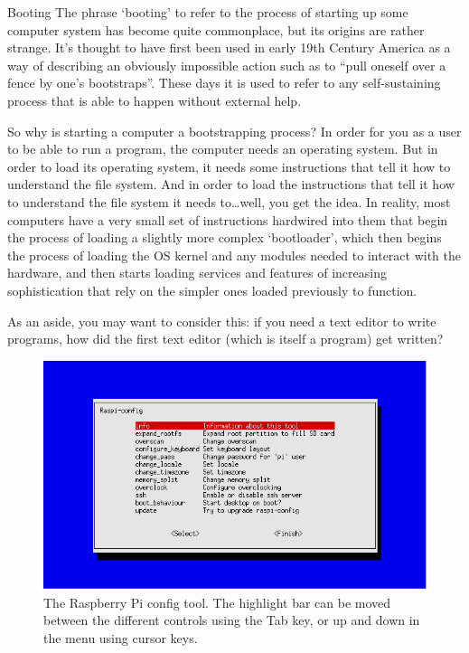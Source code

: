 \begin{diversion}{Booting}
\label{bootbox}
The phrase `booting' to refer to the process of starting up some computer system has become quite commonplace, but its origins are rather strange. It's thought to have first been used in early 19th Century America as a way of describing an obviously impossible action such as to ``pull oneself over a fence by one's bootstraps''. These days it is used to refer to any self-sustaining process that is able to happen without external help.

So why is starting a computer a bootstrapping process? In order for you as a user to be able to run a program, the computer needs an operating system. But in order to load its operating system, it needs some instructions that tell it how to understand the file system. And in order to load the instructions that tell it how to understand the file system it needs to\ldots well, you get the idea. In reality, most computers have a very small set of instructions hardwired into them that begin the process of loading a  slightly more complex `bootloader', which then begins the process of loading the OS kernel and any modules needed to interact with the hardware, and then starts loading services and features of increasing sophistication that rely on the simpler ones loaded previously to function.

As an aside, you may want to consider this: if you need a text editor to write programs, how did the first text editor (which is itself a program) get written?
\end{diversion}

\begin{figure}
\centerline{\includegraphics[width=13cm]{images/raspi-config.png}}
\caption{The Raspberry Pi config tool. The highlight bar can be moved between the different controls using the Tab key, or up and down in the menu using cursor keys.}\label{figure:raspi-config}
\end{figure}

